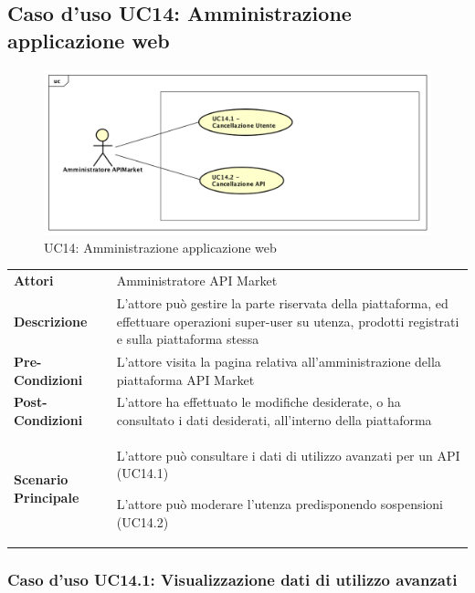 \newpage
\subsection{Caso d'uso UC14: Amministrazione applicazione web}
\label{UC14}
\begin{figure}[ht]
	\centering
	\includegraphics[scale=0.45]{UML/UC14.png}
	\caption{UC14: Amministrazione applicazione web}
\end{figure}

\renewcommand*{\arraystretch}{1.6}
\begin{longtable}{ l | p{11cm}}
	\hline
	\rowcolor{Gray}
	\multicolumn{2}{c}{UC14: Amministrazione applicazione web} \\
	\hline
	\textbf{Attori} & Amministratore API Market \\
	\textbf{Descrizione} & L'attore può gestire la parte riservata della piattaforma, ed effettuare operazioni super-user su utenza, prodotti registrati e sulla piattaforma stessa \\
	\textbf{Pre-Condizioni} & L'attore visita la pagina relativa all'amministrazione della piattaforma API Market\\
	\textbf{Post-Condizioni}& L'attore ha effettuato le modifiche desiderate, o ha consultato i dati desiderati, all'interno della piattaforma\\
	\textbf{Scenario Principale} & \begin{enumerate*}[label=(\arabic*.),itemjoin={\newline}]
		\item L'attore può consultare i dati di utilizzo avanzati per un API (UC14.1)
		\item L'attore può moderare l'utenza predisponendo sospensioni (UC14.2)
	\end{enumerate*}\\
\end{longtable}


\subsubsection{Caso d'uso UC14.1: Visualizzazione dati di utilizzo avanzati}
\label{UC14_1}

